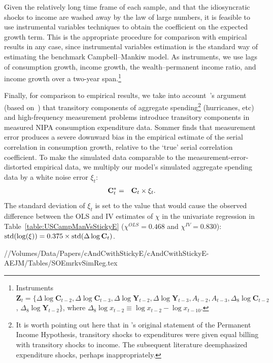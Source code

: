 Given the relatively long time frame of each sample, and that the idiosyncratic shocks to income are washed away by the law of large numbers, it is feasible to use instrumental variables techniques to obtain the coefficient on the expected growth term.  This is the appropriate procedure for comparison with empirical results in any case, since instrumental variables estimation is the standard way of estimating the benchmark Campbell--Mankiw model.  As instruments, we use lags of consumption growth, income growth, the wealth--permanent income ratio, and income growth over a two-year span.\footnote{Instruments $\textbf{Z}_t = \{\Delta \log \mathbf{C}_{t-2}, \Delta \log \mathbf{C}_{t-3}, \Delta \log \mathbf{Y}_{t-2}, \Delta \log \mathbf{Y}_{t-3}, A_{t-2}, A_{t-3}, \Delta_8 \log \mathbf{C}_{t-2}$, $\Delta_8 \log \mathbf{Y}_{t-2} \}$, where $\Delta_8 \log x_{t-2}\equiv \log x_{t-2}-\log x_{t-10}$.}

Finally, for comparison to empirical results, we take into account~\cite{som07}'s argument (based on~\cite{wilcox:aer}) that transitory components of aggregate spending\footnote{It is worth pointing out here that in \cite{friedmanATheory}'s original statement of the Permanent Income Hypothesis, transitory shocks to expenditures were given equal billing with transitory shocks to income.  The subsequent literature deemphasized expenditure shocks, perhaps inappropriately.} (hurricanes, etc) and high-frequency measurement problems introduce transitory components in measured NIPA consumption expenditure data.  Sommer finds that measurement error produces a severe downward bias in the empirical estimate of the serial correlation in consumption growth, relative to the `true' serial correlation coefficient.  To make the simulated data comparable to the measurement-error-distorted empirical data, we multiply our model's simulated aggregate spending data by a white noise error $\xi_t$:
\begin{eqnarray*}
	{\mathbf{C}}^*_{t} & = & \mathbf{C}_{t}\times\xi_{t}.
\end{eqnarray*}
The standard deviation of $\xi_t$ is set to the value that would cause the observed difference between the OLS and IV estimates of $\chi$ in the univariate regression in Table~\ref{table:USCampManVsStickyE} ($\chi^{OLS}=0.468$ and $\chi^{IV}=0.830$): $\operatorname{std}(\log(\xi))= 0.375\times\operatorname{std}(\Delta \log \mathbf{C}_t)$.

//Volumes/Data/Papers/cAndCwithStickyE/cAndCwithStickyE-AEJM/Tables/SOEmrkvSimReg.tex

